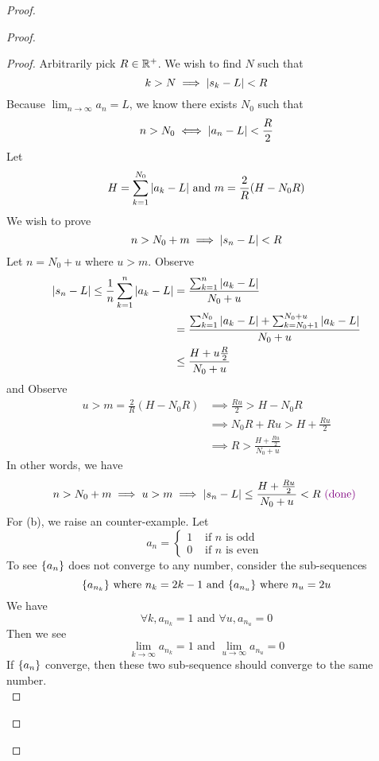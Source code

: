 \documentclass{report}
\begin{document}
\begin{proof}
\begin{proof}
\begin{proof}
Arbitrarily pick $R\in\mathbb{R}^+$. We wish to find $N$ such that 
 \begin{equation}
k>N\implies |s_k-L|<R
\end{equation}
Because $\lim_{n\to\infty}a_n=L$, we know there exists $N_0$ such that 
 \begin{equation}
n>N_0\iff |a_n-L|<\frac{R}{2}
\end{equation}
Let
\begin{equation}
H=\sum_{k=1}^{N_0} |a_k-L|\text{ and }m=\frac{2}{R}(H-N_0R)
\end{equation}
We wish to prove
\begin{equation}
n>N_0+m \implies |s_n-L|<R
\end{equation}
Let $n=N_0+u$ where $u>m$. Observe
\begin{align}
  |s_n-L|\leq \frac{1}{n}\sum_{k=1}^n |a_k-L|&=\frac{\sum_{k=1}^n |a_k-L|}{N_0+u}\\
  &= \frac{\sum_{k=1}^{N_0} |a_k-L|+\sum_{k=N_0+1}^{N_0+u} |a_k-L|}{N_0+u}\\
  &\leq \frac{H+u \frac{R}{2}}{N_0+u}
\end{align}
and Observe 
\begin{align}
  u>m=\frac{2}{R}(H-N_0R)&\implies \frac{Ru}{2}>H-N_0R\\
                         &\implies N_0R+ Ru>H+ \frac{Ru}{2}\\
&\implies R>\frac{H+\frac{Ru}{2}}{N_0+u}
\end{align}
In other words, we have
\begin{equation}
n>N_0+m \implies u>m\implies |s_n-L|\leq \frac{H+\frac{Ru}{2}}{N_0+u}<R\textcolor{violet}{\text{ (done) }}
\end{equation}
For (b), we raise an counter-example. Let
\begin{equation}
a_n=\begin{cases}
  1& \text{ if $n$ is odd }\\
  0& \text{ if $n$ is even }
\end{cases}
\end{equation}
To see $\{ a_n \}$ does not converge to any number, consider the sub-sequences
\begin{equation}
\{ a_{n_k} \}\text{ where }n_k=2k-1\text{ and }\{ a_{n_u} \}\text{ where }n_u=2u
\end{equation}
We have
\begin{equation}
\forall k,a_{n_k}=1\text{ and }\forall u,a_{n_u}=0
\end{equation}
Then we see 
\begin{equation}
\lim_{k\to\infty}a_{n_k}=1\text{ and }\lim_{u\to\infty}a_{n_u}=0
\end{equation}
If $\{ a_n \}$ converge, then these two sub-sequence should converge to the same number.\\


\end{proof}
\end{proof}
\end{proof}
\end{document}
